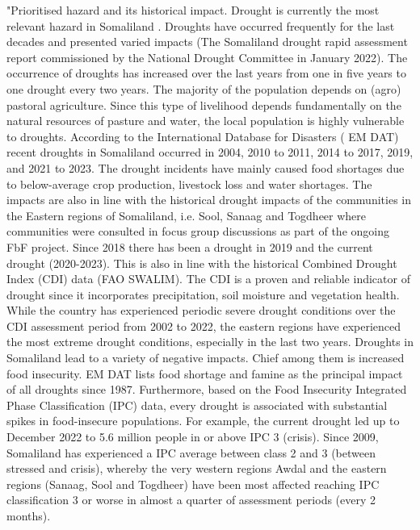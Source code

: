 {{"Prioritised hazard and its historical impact.
Drought is currently the most relevant hazard in Somaliland . Droughts have occurred frequently for the last decades and presented varied impacts (The Somaliland drought rapid assessment report commissioned by the National Drought Committee in January 2022).  The occurrence of droughts has increased over the last years from one in five years to one drought every two years. The majority of the population depends on (agro) pastoral agriculture. Since this type of livelihood depends fundamentally on the natural resources of pasture and water, the local population is highly vulnerable to droughts. 
According to the International Database for Disasters ( EM DAT) recent droughts in Somaliland occurred in 2004, 2010 to 2011, 2014 to 2017, 2019, and 2021 to 2023. The drought incidents have mainly caused food shortages due to below-average crop production, livestock loss and water shortages. The impacts are also in line with the historical drought impacts of the communities in the Eastern regions of Somaliland, i.e. Sool, Sanaag and Togdheer where communities were consulted in focus group discussions as part of the ongoing FbF project.  Since 2018 there has been a drought in 2019 and the current drought (2020-2023). This is also in line with the historical Combined Drought Index (CDI) data (FAO SWALIM). The CDI is a proven and reliable indicator of drought since it incorporates precipitation, soil moisture and vegetation health. While the country has experienced periodic severe drought conditions over the CDI assessment period from 2002 to 2022, the eastern regions have experienced the most extreme drought conditions, especially in the last two years. Droughts in Somaliland lead to a variety of negative impacts. Chief among them is increased food insecurity. EM DAT  lists food shortage and famine as the principal impact of all droughts since 1987. Furthermore, based on the Food Insecurity Integrated Phase Classification (IPC) data, every drought is associated with substantial spikes in food-insecure populations. For example, the current drought led up to December 2022 to 5.6 million people in or above IPC 3 (crisis). Since 2009, Somaliland has experienced a IPC average between class 2 and 3 (between stressed and crisis), whereby the very western regions Awdal and the eastern regions (Sanaag, Sool and Togdheer) have been most affected reaching IPC classification 3 or worse in almost a quarter of assessment periods (every 2 months). 
}}
